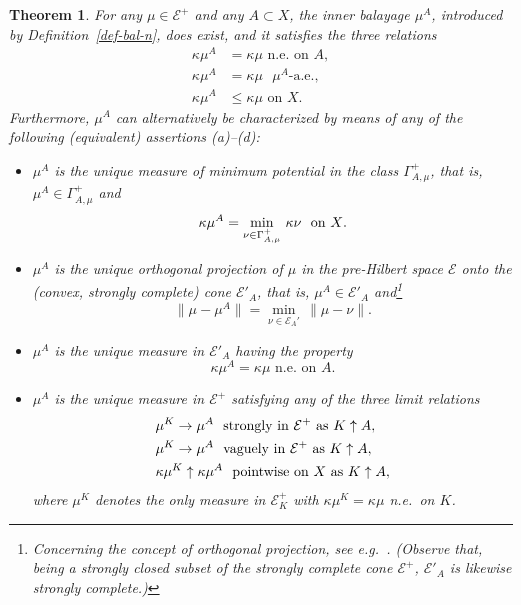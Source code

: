 \documentclass[12pt,a4paper,reqno]{amsart} %
\theoremstyle{lause}
\theoremstyle{maaritelma}
\theoremstyle{lause}
\newtheorem{theorem}{Theorem}[section]
\theoremstyle{maaritelma}
\numberwithin{equation}{section}
\begin{document}
\begin{theorem}\label{th-intr}For any\/ $\mu\in\mathcal E^+$ and any\/ $A\subset X$, the inner balayage\/ $\mu^A$, introduced by Definition\/~{\rm\ref{def-bal-n}}, does exist, and it  satisfies the three relations
\begin{align}
\label{eq-pr-10}\kappa\mu^A&=\kappa\mu\text{ \ n.e.\ on\ }A,\\
\label{eq-pr-101}\kappa\mu^A&=\kappa\mu\text{ \ $\mu^A$-a.e.,}\\
\label{eq-pr-102}\kappa\mu^A&\leqslant\kappa\mu\text{ \ on $X$.}
\end{align}
Furthermore, $\mu^A$ can alternatively be characterized by means of any of the following\/ {\rm(}equivalent\/{\rm)} assertions\/ {\rm(a)--(d)}:
\begin{itemize}
\item[\rm(a)] $\mu^A$ is the unique measure of minimum potential in the class\/ $\Gamma_{A,\mu}^+$, that is,  $\mu^A\in\Gamma_{A,\mu}^+$ and
\[\kappa\mu^A=\min_{\nu\in\Gamma_{A,\mu}^+}\,\kappa\nu\text{ \ on\/ $X$}.\]
\item[\rm(b)] $\mu^A$ is the unique orthogonal projection of\/ $\mu$ in the pre-Hilbert space\/ $\mathcal E$ onto the\/ {\rm(}convex, strongly complete\/{\rm)} cone $\mathcal E'_A$, that is, $\mu^A\in\mathcal E'_A$ and\/\footnote{Concerning the concept of orthogonal projection, see e.g.\ \cite[Theorem~1.12.3]{E2}. (Observe that, being a strongly closed subset of the strongly complete cone $\mathcal E^+$, $\mathcal E'_A$ is likewise strongly complete.)}
\[\|\mu-\mu^A\|=\min_{\nu\in\mathcal E_A'}\,\|\mu-\nu\|.\]
\item[\rm(c)] $\mu^A$ is the unique measure in\/ $\mathcal E'_A$ having the property
\[\kappa\mu^A=\kappa\mu\text{ \ n.e.\ on\ }A.\]
\item[\rm(d)] $\mu^A$ is the unique measure in\/ $\mathcal E^+$ satisfying any of the three limit relations
\begin{align*}
 &\mu^K\to\mu^A\text{ \ strongly in\/ $\mathcal E^+$ as\/ $K\uparrow A$},\\
 &\mu^K\to\mu^A\text{ \ vaguely in\/ $\mathcal E^+$ as\/ $K\uparrow A$},\\
 &\kappa\mu^K\uparrow\kappa\mu^A\text{ \ pointwise on\/ $X$ as\/ $K\uparrow A$},
\end{align*}
where\/ $\mu^K$ denotes the only measure in\/ $\mathcal E^+_K$ with\/ $\kappa\mu^K=\kappa\mu$ n.e.\ on\/ $K$.
\end{itemize}
\end{theorem}
\end{document}
